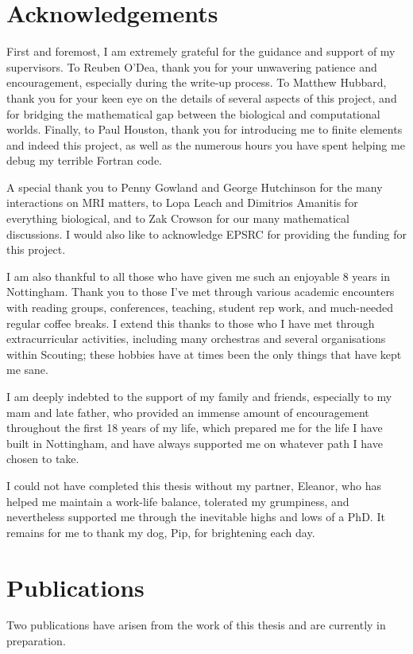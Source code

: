 \documentclass[a4paper, 12pt, oneside, colorinlistoftodos]{book}
\begin{document}
    \chapter*{Acknowledgements}
        First and foremost, I am extremely grateful for the guidance and support of my supervisors. To Reuben O'Dea, thank you for your unwavering patience and encouragement, especially during the write-up process. To Matthew Hubbard, thank you for your keen eye on the details of several aspects of this project, and for bridging the mathematical gap between the biological and computational worlds. Finally, to Paul Houston, thank you for introducing me to finite elements and indeed this project, as well as the numerous hours you have spent helping me debug my terrible Fortran code.

        A special thank you to Penny Gowland and George Hutchinson for the many interactions on MRI matters, to Lopa Leach and Dimitrios Amanitis for everything biological, and to Zak Crowson for our many mathematical discussions. I would also like to acknowledge EPSRC for providing the funding for this project.

        I am also thankful to all those who have given me such an enjoyable 8 years in Nottingham. Thank you to those I've met through various academic encounters with reading groups, conferences, teaching, student rep work, and much-needed regular coffee breaks. I extend this thanks to those who I have met through extracurricular activities, including many orchestras and several organisations within Scouting; these hobbies have at times been the only things that have kept me sane.

        I am deeply indebted to the support of my family and friends, especially to my mam and late father, who provided an immense amount of encouragement throughout the first 18 years of my life, which prepared me for the life I have built in Nottingham, and have always supported me on whatever path I have chosen to take.

        I could not have completed this thesis without my partner, Eleanor, who has helped me maintain a work-life balance, tolerated my grumpiness, and nevertheless supported me through the inevitable highs and lows of a PhD. It remains for me to thank my dog, Pip, for brightening each day.

    \renewcommand{\thesection}{\hspace{-6pt}}
    \chapter*{Publications}
        Two publications have arisen from the work of this thesis and are currently in preparation.
\end{document}
